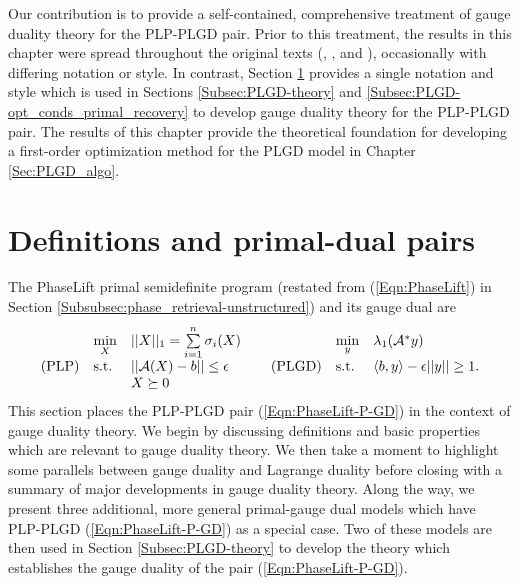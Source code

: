 Our contribution is to provide a self-contained, comprehensive treatment of gauge duality theory for the PLP-PLGD pair.  Prior to this treatment, the results in this chapter were spread throughout the original texts (\cite{rockafellar1970convex}, \cite{DBLP:journals/siamjo/FriedlanderMP14}, and \cite{DBLP:journals/siamsc/FriedlanderM16}), occasionally with differing notation or style.  In contrast, Section \ref{Subsec:PLGD-models_intro} provides a single notation and style which is used in Sections \ref{Subsec:PLGD-theory} and \ref{Subsec:PLGD-opt_conds_primal_recovery} to develop gauge duality theory for the PLP-PLGD pair.  The results of this chapter provide the theoretical foundation for developing a first-order optimization method for the PLGD model in Chapter \ref{Sec:PLGD_algo}.


\section{Definitions and primal-dual pairs}		\label{Subsec:PLGD-models_intro}



The PhaseLift primal semidefinite program (restated from (\ref{Eqn:PhaseLift}) in Section \ref{Subsubsec:phase_retrieval-unstructured}) and its gauge dual are
\begin{equation} \label{Eqn:PhaseLift-P-GD}
\begin{array}{lllllll}
	&	\min\limits_{\substack{X}}
		&	||X||_1 = \sum\limits_{\substack{i=1}}^{\substack{n}} \sigma_i(X)
			&
				&	\min\limits_{\substack{y}}
					&	\lambda_1({\mathcal A}^* y)
						\\
\textnormal{(PLP)}
	&	\textnormal{s.t.}
		& 	|| {\mathcal A} (X) - b || \leq \epsilon
			&	\hspace{0.4cm} 	\textnormal{(PLGD)}
				&	\textnormal{s.t.}
					&	\langle b, y \rangle - \epsilon ||y|| \geq 1.
						\\

	&
		&	X \succeq 0

\end{array}
\end{equation}
This section places the PLP-PLGD pair (\ref{Eqn:PhaseLift-P-GD}) in the context of gauge duality theory.  We begin by discussing definitions and basic properties which are relevant to gauge duality theory. 
We then take a moment to highlight some parallels between gauge duality and Lagrange duality before closing with a summary of major developments in gauge duality theory.  
Along the way, we present three additional, more general primal-gauge dual models which have PLP-PLGD (\ref{Eqn:PhaseLift-P-GD}) as a special case.  Two of these models are then used in Section \ref{Subsec:PLGD-theory} to develop the theory which establishes the gauge duality of the pair (\ref{Eqn:PhaseLift-P-GD}).





